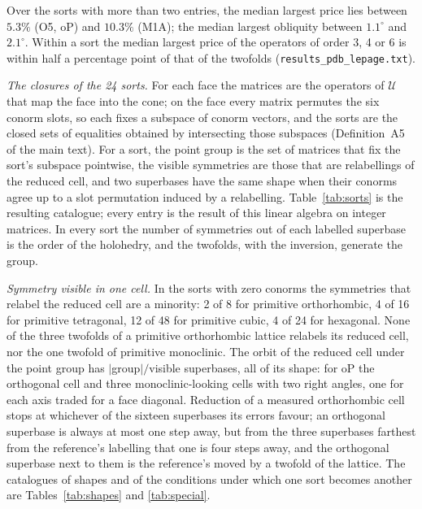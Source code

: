 \documentclass[preprint,pdf]{iucr}          %
\begin{document}
Over the sorts with more than two entries, the median largest price lies between $5.3\%$ (O5, oP) and $10.3\%$ (M1A); the median largest obliquity between $1.1^\circ$ and $2.1^\circ$. Within a sort the median largest price of the operators of order 3, 4 or 6 is within half a percentage point of that of the twofolds (\texttt{results\_pdb\_lepage.txt}).

\emph{The closures of the 24 sorts.}\label{si:sorts} For each face the matrices are the operators of $\mathcal U$ that map the face into the cone; on the face every matrix permutes the six conorm slots, so each fixes a subspace of conorm vectors, and the sorts are the closed sets of equalities obtained by intersecting those subspaces (Definition~A5 of the main text). For a sort, the point group is the set of matrices that fix the sort's subspace pointwise, the visible symmetries are those that are relabellings of the reduced cell, and two superbases have the same shape when their conorms agree up to a slot permutation induced by a relabelling. Table~\ref{tab:sorts} is the resulting catalogue; every entry is the result of this linear algebra on integer matrices. In every sort the number of symmetries out of each labelled superbase is the order of the holohedry, and the twofolds, with the inversion, generate the group.

\emph{Symmetry visible in one cell.} In the sorts with zero conorms the symmetries that relabel the reduced cell are a minority: 2 of 8 for primitive orthorhombic, 4 of 16 for primitive tetragonal, 12 of 48 for primitive cubic, 4 of 24 for hexagonal. None of the three twofolds of a primitive orthorhombic lattice relabels its reduced cell, nor the one twofold of primitive monoclinic. The orbit of the reduced cell under the point group has $|$group$|/$visible superbases, all of its shape: for oP the orthogonal cell and three monoclinic-looking cells with two right angles, one for each axis traded for a face diagonal. Reduction of a measured orthorhombic cell stops at whichever of the sixteen superbases its errors favour; an orthogonal superbase is always at most one step away, but from the three superbases farthest from the reference's labelling that one is four steps away, and the orthogonal superbase next to them is the reference's moved by a twofold of the lattice. The catalogues of shapes and of the conditions under which one sort becomes another are Tables~\ref{tab:shapes} and \ref{tab:special}.
\end{document}
